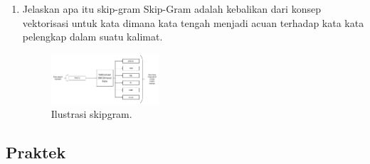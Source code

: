 \begin{enumerate}
	\item Jelaskan apa itu skip-gram
	\hfill\break
	Skip-Gram adalah kebalikan dari konsep vektorisasi untuk kata dimana kata tengah menjadi acuan terhadap kata kata pelengkap dalam suatu kalimat.

	\begin{figure}[H]
	    \centering
	    \includegraphics[width=4cm]{figures/1174096/tugas5/1-6.PNG}
	    \caption{Ilustrasi skipgram.}
	\end{figure}
\end{enumerate}
\subsection{Praktek}
